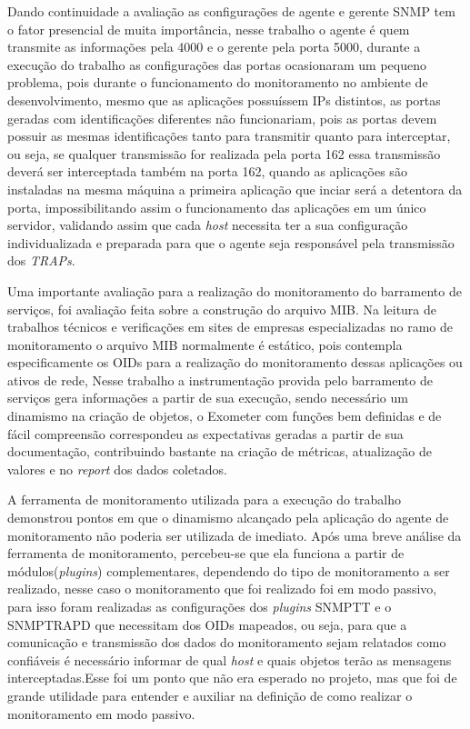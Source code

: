 Dando continuidade a avaliação as configurações de agente e gerente \acrshort{SNMP} tem o fator presencial de muita importância, nesse trabalho o agente é quem transmite as informações pela 4000 e o gerente pela porta 5000, durante a execução do trabalho as configurações das portas ocasionaram um pequeno problema, pois durante o funcionamento do monitoramento no ambiente de desenvolvimento, mesmo que as aplicações possuíssem \acrshort{IP}s distintos, as portas geradas com identificações diferentes não funcionariam, pois as portas devem possuir as mesmas identificações tanto para transmitir quanto para interceptar, ou seja, se qualquer transmissão for realizada pela porta 162 essa transmissão deverá ser interceptada também na porta 162, quando as aplicações são instaladas na mesma máquina a primeira aplicação que inciar será a detentora da porta, impossibilitando assim o funcionamento das aplicações em um único servidor, validando assim que cada \textit{host} necessita ter a sua configuração individualizada e preparada para que o agente seja responsável pela transmissão dos \textit{TRAPs}. 

Uma importante avaliação para a realização do monitoramento do barramento de serviços, foi avaliação feita sobre a construção do arquivo MIB. Na leitura de trabalhos técnicos e verificações em sites de empresas especializadas no ramo de monitoramento o arquivo MIB normalmente é estático, pois contempla especificamente os \acrshort{OID}s para a realização do monitoramento dessas aplicações ou ativos de rede, Nesse trabalho a instrumentação provida pelo barramento de serviços gera informações a partir de sua execução, sendo necessário um dinamismo na criação de objetos, o Exometer com funções bem definidas e de fácil compreensão correspondeu as expectativas geradas a partir de sua documentação, contribuindo bastante na criação de métricas, atualização de valores e no \textit{report} dos dados coletados.  

A ferramenta de monitoramento utilizada para a execução do trabalho demonstrou pontos em que o dinamismo alcançado pela aplicação do agente de monitoramento não poderia ser utilizada de imediato. Após uma breve análise da ferramenta de monitoramento, percebeu-se que ela funciona a partir de módulos(\textit{plugins}) complementares, dependendo do tipo de monitoramento a ser realizado, nesse caso o monitoramento que foi realizado foi em modo passivo, para isso foram realizadas as configurações dos \textit{plugins} \acrshort{SNMPTT} e o SNMPTRAPD que necessitam dos \acrshort{OID}s mapeados, ou seja, para que a comunicação e transmissão dos dados do monitoramento sejam relatados como confiáveis é necessário informar de qual \textit{host} e quais objetos terão as mensagens interceptadas.Esse foi um ponto que não era esperado no projeto, mas que foi de grande utilidade para entender e auxiliar na definição de como realizar o monitoramento em modo passivo.   




